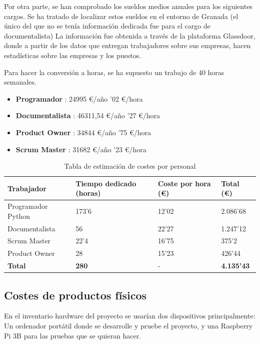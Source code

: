 Por otra parte, se han comprobado los sueldos medios anuales para los siguientes cargos. Se ha tratado de localizar estos sueldos en el entorno de Granada (el único del que no se tenía información dedicada fue para el cargo de documentalista) La información fue obtenida a través de la plataforma Glassdoor, donde a partir de los datos que entregan trabajadores sobre sus empresas, hacen estadísticas sobre las empresas y los puestos.

Para hacer la conversión a horas, se ha supuesto un trabajo de 40 horas semanales.
\begin{itemize}
	\item \textbf{Programador} \cite{glassdoor-softwaredeveloper}: 24995 €/año '02 €/hora
	\item \textbf{Documentalista} \cite{glassdoor-documentalist}: 46311,54 €/año '27 €/hora
	\item \textbf{Product Owner} \cite{glassdoor-productowner}: 34844 €/año '75 €/hora
	\item \textbf{Scrum Master} \cite{glassdoor-ScrumMaster}: 31682 €/año '23 €/hora
\end{itemize}

\begin{center}
	\begin{table}[H]
		\centering
		\begin{tabularx}{\textwidth}{|X|X|X|X|}
			\hhline{|-|-|-|-|}
			{\cellcolor{lightblue}} \textbf{Trabajador} & {\cellcolor{lightblue}} \textbf{Tiempo dedicado (horas)} & {\cellcolor{lightblue}} \textbf{Coste por hora (€)} & {\cellcolor{lightblue}} \textbf{Total (€)} \\
			\hline
			Programador Python & 173'6 & 12'02 & 2.086'68  \\
			\hline
			Documentalista & 56 & 22'27 & 1.247'12 \\
			\hline
			Scrum Master & 22'4 & 16'75 & 375'2 \\
			\hline
			Product Owner & 28 & 15'23 & 426'44 \\
			\hline
			\textbf{Total} & \textbf{280} & - & \textbf{4.135'43} \\
			\hline
		\end{tabularx}
		\caption{Tabla de estimación de costes por personal}
	\end{table}
\end{center}
	
\subsection {Costes de productos físicos}
En el inventario hardware del proyecto se usarían dos dispositivos principalmente: Un ordenador portátil donde se desarrolle y pruebe el proyecto, y una Raspberry Pi 3B para las pruebas que se quieran hacer.

